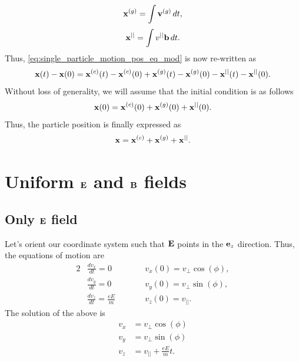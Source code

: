 \documentclass[a4paper,11pt]{report}
\begin{document}
\begin{equation}
    \mathbf{x}^{(g)} = \int \mathbf{v}^{(g)} \, dt,
\end{equation}
\begin{equation}
    \mathbf{x}^{||} = \int v^{||} \mathbf{b} \, dt.
\end{equation}
Thus, \cref{eq:single_particle_motion_pos_eq_mod} is now re-written as
\begin{equation}
    \mathbf{x}(t) - \mathbf{x}(0) = \mathbf{x}^{(c)}(t) - \mathbf{x}^{(c)}(0) + \mathbf{x}^{(g)}(t) - \mathbf{x}^{(g)}(0) - \mathbf{x}^{||}(t) - \mathbf{x}^{||}(0).
\end{equation}
Without loss of generality, we will assume that the initial condition is as follows
\begin{equation}
    \mathbf{x}(0) = \mathbf{x}^{(c)}(0) + \mathbf{x}^{(g)}(0) + \mathbf{x}^{||}(0).
\end{equation}
Thus, the particle position is finally expressed as
\begin{equation}
    \label{eq:single_particle_motion_pos_general}
    \mathbf{x} = \mathbf{x}^{(c)} + \mathbf{x}^{(g)} + \mathbf{x}^{||}.
\end{equation}

\section{Uniform $\mathbf{E}$ and $\mathbf{B}$ fields}

\subsection{Only $\mathbf{E}$ field}
Let's orient our coordinate system such that $\mathbf{E}$ points in the $\mathbf{e}_z$ direction. Thus, the equations of motion are
\begin{alignat}{2}
    &\frac{d v_x}{dt} = 0  \qquad && v_x(0) = v_\perp \cos(\phi), \nonumber \\
    &\frac{d v_y}{dt} = 0  \qquad && v_y(0) = v_\perp \sin(\phi), \nonumber \\
    &\frac{d v_z}{dt} = \frac{e E}{m}  \qquad && v_z(0) = v_{||}.
\end{alignat}
The solution of the above is
\begin{align}
    v_x &= v_\perp \cos(\phi) \nonumber \\
    v_y &= v_\perp \sin(\phi) \nonumber \\
    v_z &= v_{||} + \frac{e E}{m} t.
\end{align}
\end{document}
